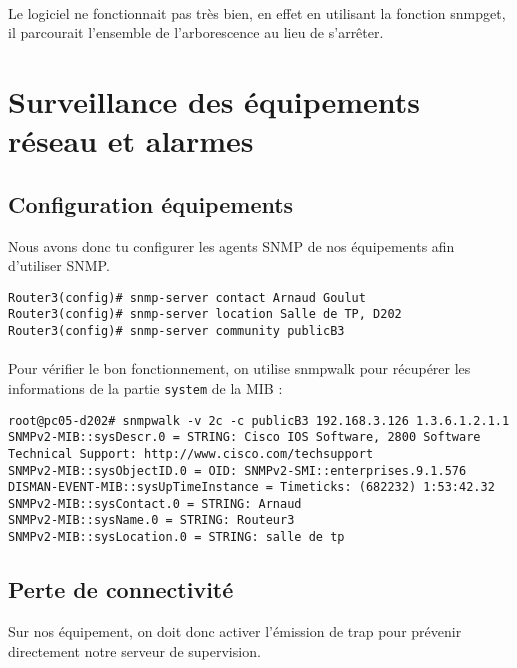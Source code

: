 \documentclass[12pt,a4paper,notitlepage]{article}
\begin{document}
\paragraph{} Le logiciel ne fonctionnait pas très bien, en effet en utilisant la fonction snmpget, il parcourait l'ensemble de l'arborescence au lieu de s'arrêter.

\section{Surveillance des équipements réseau et alarmes}
\subsection{Configuration équipements}
Nous avons donc tu configurer les agents SNMP de nos équipements afin d'utiliser SNMP.\\
\begin{lstlisting}[title=Commandes Cisco pour configurer l'agent SNMP du routeur]
Router3(config)# snmp-server contact Arnaud Goulut
Router3(config)# snmp-server location Salle de TP, D202
Router3(config)# snmp-server community publicB3
\end{lstlisting}

\paragraph{} Pour vérifier le bon fonctionnement, on utilise snmpwalk pour récupérer les informations de la partie \texttt{system} de la MIB :

\begin{lstlisting}[title=Vérification du fonctionnement SNMP sur le routeur]
root@pc05-d202# snmpwalk -v 2c -c publicB3 192.168.3.126 1.3.6.1.2.1.1
SNMPv2-MIB::sysDescr.0 = STRING: Cisco IOS Software, 2800 Software
Technical Support: http://www.cisco.com/techsupport
SNMPv2-MIB::sysObjectID.0 = OID: SNMPv2-SMI::enterprises.9.1.576
DISMAN-EVENT-MIB::sysUpTimeInstance = Timeticks: (682232) 1:53:42.32
SNMPv2-MIB::sysContact.0 = STRING: Arnaud
SNMPv2-MIB::sysName.0 = STRING: Routeur3
SNMPv2-MIB::sysLocation.0 = STRING: salle de tp
\end{lstlisting}

\subsection{Perte de connectivité}
Sur nos équipement, on doit donc activer l'émission de trap pour prévenir directement notre serveur de supervision.
\end{document}
